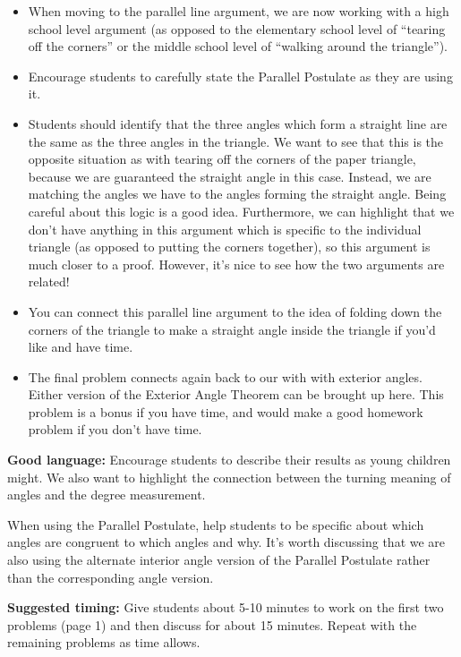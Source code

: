 \documentclass[nooutcomes,noauthor]{ximera}
\begin{document}
\begin{instructorNotes}
\begin{itemize}
\item When moving to the parallel line argument, we are now working with a high school level argument (as opposed to the elementary school level of ``tearing off the corners'' or the middle school level of ``walking around the triangle''). 
\item Encourage students to carefully state the Parallel Postulate as they are using it. 
\item Students should identify that the three angles which form a straight line are the same as the three angles in the triangle. We want to see that this is the opposite situation as with tearing off the corners of the paper triangle, because we are guaranteed the straight angle in this case. Instead, we are matching the angles we have to the angles forming the straight angle. Being careful about this logic is a good idea. Furthermore, we can highlight that we don't have anything in this argument which is specific to the individual triangle (as opposed to putting the corners together), so this argument is much closer to a proof. However, it's nice to see how the two arguments are related!
\item You can connect this parallel line argument to the idea of folding down the corners of the triangle to make a straight angle inside the triangle if you'd like and have time.
\item The final problem connects again back to our with with exterior angles. Either version of the Exterior Angle Theorem can be brought up here. This problem is a bonus if you have time, and would make a good homework problem if you don't have time.
\end{itemize}

{\bf Good language:} Encourage students to describe their results as young children might. We also want to highlight the connection between the turning meaning of angles and the degree measurement.

When using the Parallel Postulate, help students to be specific about which angles are congruent to which angles and why. It's worth discussing that we are also using the alternate interior angle version of the Parallel Postulate rather than the corresponding angle version.



{\bf Suggested timing:} Give students about 5-10 minutes to work on the first two problems (page 1) and then discuss for about 15 minutes. Repeat with the remaining problems as time allows.




\end{instructorNotes}
\end{document}
